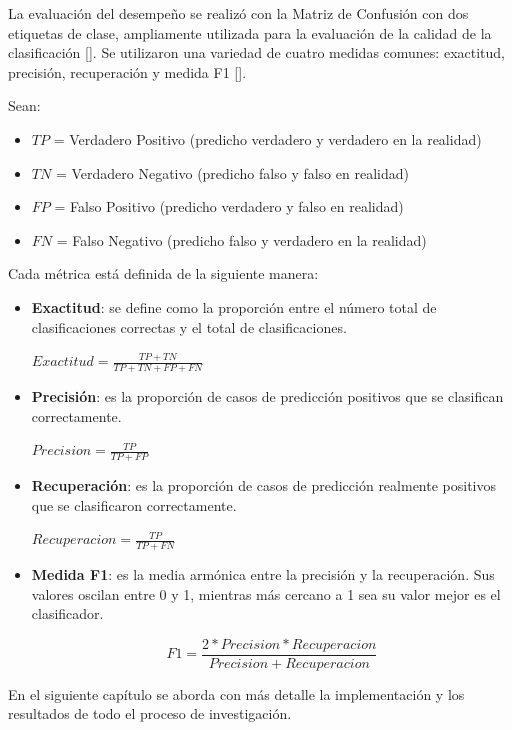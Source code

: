 La evaluación del desempeño se realizó con la Matriz de Confusión con dos etiquetas de clase, ampliamente utilizada para la evaluación de la calidad de la clasificación [\cite{faul2019concise}]. Se utilizaron una variedad de cuatro medidas comunes: exactitud, precisión, recuperación y medida F1 [\cite{rehman2019automatic}].

Sean:  
\begin{itemize}
    \item $TP$ = Verdadero Positivo (predicho verdadero y verdadero en la realidad)
    \item $TN$ = Verdadero Negativo (predicho falso y falso en realidad)
    \item $FP$ = Falso Positivo (predicho verdadero y falso en realidad)
    \item $FN$ = Falso Negativo (predicho falso y verdadero en la realidad)
\end{itemize}

Cada métrica está definida de la siguiente manera:  
\begin{itemize}
    \item \textbf{Exactitud}: se define como la proporción entre el número total de clasificaciones correctas y el total de clasificaciones.
    \begin{center}
        $Exactitud = \frac{TP + TN}{TP + TN + FP+ FN} $
    \end{center}
    \item \textbf{Precisión}: es la proporción de casos de predicción positivos que se clasifican correctamente. 
    \begin{center}
        $Precision = \frac{TP}{TP + FP}$
    \end{center}
    \item \textbf{Recuperación}: es la proporción de casos de predicción realmente positivos que se clasificaron correctamente. 
    \begin{center}
        $Recuperacion = \frac{TP}{TP+FN}$
    \end{center}
    \item \textbf{Medida F1}: es la media armónica entre la precisión y la recuperación. Sus valores oscilan entre 0 y 1, mientras más cercano a 1 sea su valor mejor es el clasificador. 
    \begin{center}
        $$F1 = \frac{2 * Precision * Recuperacion}{Precision + Recuperacion}$$
    \end{center}

\end{itemize}

En el siguiente capítulo se aborda con más detalle la implementación y los resultados de todo el proceso de investigación.  


